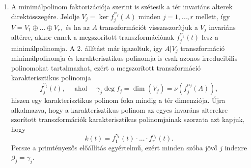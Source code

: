 \documentclass[9pt, a4paper, showtrims]{memoir}
\makeatletter
\renewenvironment{proof}[1][\proofname]
    {\par\pushQED{\qed}%
    \normalfont \topsep6\p@\@plus6\p@\relax
    \trivlist
    \item[\hskip\labelsep
        \itshape
    #1\@addpunct{:}]\ignorespaces}
    {\popQED\endtrivlist\@endpefalse}
\theoremstyle{plain}
\theoremstyle{remark}
\theoremstyle{definition}
\makeatother
\begin{document}
\begin{proof}
\begin{enumerate}
        \item
    A minimálpolinom faktorizációja szerint is szétesik a tér invariáns alterek direktösszegére.
    Jelölje 
    $
    V_j=\ker f_j^{\alpha_j}\left( A \right)
    $ minden $j=1,\ldots,r$ mellett,
    így 
    \begin{math}
        V
        =
        V_1\oplus\ldots\oplus V_r,
    \end{math}
    és ha az $A$ transzformációt visszaszorítjuk a $V_j$ invariáns altérre,
    akkor ennek a megszorított transzformációnak $f_j^{\alpha_j}\left( t \right)$ 
    lesz a minimálpolinomja.
    A 2. állítást már igazoltuk, így $A|V_j$ transzformáció minimálpolinomja
    és karakterisztikus polinomja is csak azonos irreducibilis polinomokat tartalmazhat, 
    ezért a megszorított transzformáció karakterisztikus polinomja
    \[
        f_j^{\gamma_j}\left( t \right),
        \quad\text{ ahol }\quad
        \gamma_j\deg f_j
        =
        \dim\left( V_j \right)
        =
        \nu\left( f_j^{\alpha_j}\left( A \right) \right),
    \]
    hiszen egy karakterisztikus polinom foka mindig a tér dimenziója.
    Újra alkalmazva, hogy a karakterisztikus polinom az egyes invaráns alterekre szorított transzformációk karakterisztikus polinomjainak szorzata azt kapjuk, hogy
    \[
        k\left( t \right)
        =
        f_1^{\gamma_1}\left( t \right)
        \cdot\ldots\cdot
        f_r^{\gamma_r}\left( t \right).
    \]
    Persze a primtényezős előállítás egyértelmű, ezért minden szóba jövő $j$ indexre
    $\beta_j=\gamma_j$.
    \qedhere
    \end{enumerate}
\end{proof}
\end{document}
